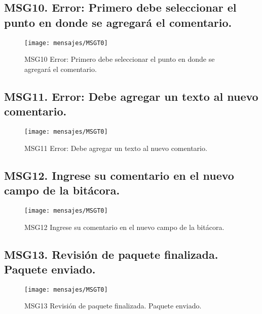 \subsection{MSG10. Error: Primero debe seleccionar el punto en donde se agregará el comentario.}
    \begin{figure}[htbp]
        \begin{center}
            \texttt{[image: mensajes/MSGT0]}
            \caption{MSG10 Error: Primero debe seleccionar el punto en donde se agregará el comentario.}
            \label{fig:MSG10}
        \end{center}
    \end{figure}

\subsection{MSG11. Error: Debe agregar un texto al nuevo comentario.}
    \begin{figure}[htbp]
        \begin{center}
            \texttt{[image: mensajes/MSGT0]}
            \caption{MSG11 Error: Debe agregar un texto al nuevo comentario.}
            \label{fig:MSG11}
        \end{center}
    \end{figure}

\subsection{MSG12. Ingrese su comentario en el nuevo campo de la bitácora.}
    \begin{figure}[htbp]
        \begin{center}
            \texttt{[image: mensajes/MSGT0]}
            \caption{MSG12 Ingrese su comentario en el nuevo campo de la bitácora.}
            \label{fig:MSG12}
        \end{center}
    \end{figure}

\subsection{MSG13. Revisión de paquete finalizada. Paquete enviado.}
    \begin{figure}[htbp]
        \begin{center}
            \texttt{[image: mensajes/MSGT0]}
            \caption{MSG13 Revisión de paquete finalizada. Paquete enviado.}
            \label{fig:MSG13}
        \end{center}
    \end{figure}

